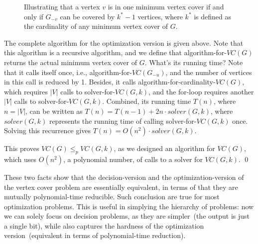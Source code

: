 \begin{figure}[h]
\centering{}
\caption{Illustrating that a vertex $v$ is in one minimum vertex cover if and only if
$G_{-v}$ can be covered by $k^* - 1$ vertices, where $k^*$ is defined as the cardinality of any minimum vertex cover of $G$.}
\label{fig:cover}
\end{figure}


\begin{minipage}{0.8\textwidth}
	\xxx
	\xxx
	\xxx
	\xxx
	\xxx
	\xxx
	\xxx
	\xxx
	\xxx
	\xxx
\end{minipage}

The complete algorithm for the optimization version is given above.
Note that this algorithm is a recursive algorithm, and we define
that algorithm-for-$VC(G)$ returns the actual minimum vertex cover of $G$.
What's its running time? Note that it calls itself once, i.e., 
algorithm-for-$VC(G_{-u})$, and the number of vertices in this call
is reduced by 1. Besides, it calls algorithm-for-cardinality-$VC(G)$,
which requires $|V|$ calls to solver-for-$VC(G, k)$,
and the for-loop requires another $|V|$ calls to solver-for-$VC(G, k)$.
Combined, its running time $T(n)$, where $n = |V|$, can be written
as $T(n) = T(n-1) + 2n\cdot solver(G,k)$, where $solver(G,k)$ represents
the running time of calling solver-for-$VC(G, k)$ once.
Solving this recurrence gives $T(n) = O(n^2)\cdot solver(G,k)$.

This proves $VC(G) \le_p VC(G,k)$, as we designed an algorithm
for $VC(G)$, which uses $O(n^2)$, a polynomial number, of calls
to a solver for $VC(G, k)$. \qed

These two facts show that the decision-version and the optimization-version
of the vertex cover problem are essentially equivalent, in terms of that they are mutually polynomial-time reducible.
Such conclusion are true for most optimization problems.
This is useful in simplying the hierarchy of problems: now we can solely focus on decision problems, as they are simpler~(the output is just a single bit),
while also captures the hardness of the optimization version~(equivalent in terms of polynomial-time reduction).

